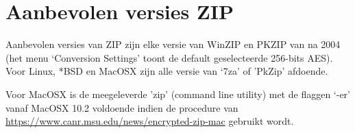 \documentclass[11.0pt,twoside,openright]{report}
\begin{document}
\section*{Aanbevolen versies ZIP}

Aanbevolen versies van ZIP zijn elke versie van WinZIP en PKZIP van na 2004 (het menu `Conversion Settings' toont de default geselecteerde 256-bits AES). Voor Linux, *BSD en MacOSX zijn alle versie van `7za' of 'PkZip' afdoende. 

Voor MacOSX is de meegeleverde 'zip' (command line utility) met de flaggen `-er' vanaf MacOSX 10.2 voldoende indien de procedure van \url{https://www.canr.msu.edu/news/encrypted-zip-mac} gebruikt wordt.
\end{document}
